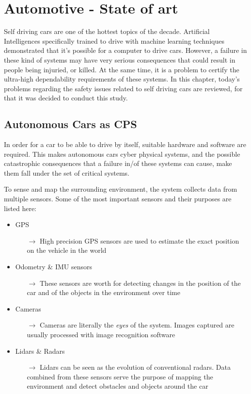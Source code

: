 \chapter{Automotive - State of art}

Self driving cars are one of the hottest topics of the decade. Artificial Intelligences specifically trained to drive with machine learning techniques demonstrated that it's possible for a computer to drive cars. However, a failure in these kind of systems may have very serious consequences that could result in people being injuried, or killed. At the same time, it is a problem to certify the ultra-high dependability requirements of these systems. In this chapter, today's problems regarding the safety issues related to self driving cars are reviewed, for that it was decided to conduct this study.

\section{Autonomous Cars as CPS}

In order for a car to be able to drive by itself, suitable hardware and software are required. This makes autonomous cars cyber physical systems, and the possible catastrophic consequences that a failure in/of these systems can cause, make them fall under the set of critical systems.

To sense and map the surrounding environment, the system collects data from multiple sensors. Some of the most important sensors and their purposes are listed here:

\begin{itemize}
	\item GPS
	\begin{itemize}
		\item[$\rightarrow$] High precision GPS sensors are used to estimate the exact position on the vehicle in the world
	\end{itemize}
	\item Odometry \& IMU sensors
	\begin{itemize}
		\item[$\rightarrow$] These sensors are worth for detecting changes in the position of the car and of the objects in the environment over time
	\end{itemize}
	\item Cameras
	\begin{itemize}
		\item[$\rightarrow$] Cameras are literally the \textsl{eyes} of the system. Images captured are usually processed with image recognition software
	\end{itemize}
	\item Lidars \& Radars
	\begin{itemize}
		\item[$\rightarrow$] Lidars can be seen as the evolution of conventional radars. Data combined from these sensors serve the purpose of mapping the environment and detect obstacles and objects around the car
	\end{itemize}
\end{itemize}

